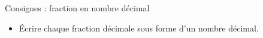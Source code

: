 \documentclass[17pt]{flash}
\begin{document}
\flashvisibletimertrue
\FlashSetItemSep{25pt}
\FlashSetVtop{-2em}

\begin{frame}{Consignes : fraction en nombre décimal}
    \begin{itemize}
        \item Écrire chaque fraction décimale sous forme d'un nombre décimal.
    \end{itemize}
\end{frame}

\AtCorrection{\small}
\end{document}
